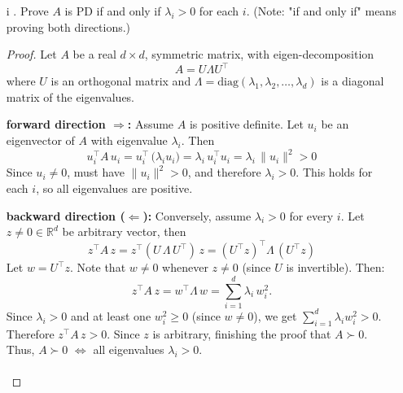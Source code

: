 \documentclass[lang=cn,11pt]{elegantbook}
\begin{document}
\begin{enumerate}
    \item[i]. Prove \(A\) is PD if and only if \(\lambda_i > 0\) for each \(i\). (Note: "if and only if" means proving both directions.)
\begin{proof}
Let \(A\) be a real \(d\times d\), symmetric matrix, with eigen-decomposition
\[
A = U\Lambda U^\top
\]
where \(U\) is an orthogonal matrix and \(\Lambda = \mathrm{diag}(\lambda_1,\lambda_2,\dots,\lambda_d)\) is a diagonal matrix of the eigenvalues.

\textbf{forward direction \(\Rightarrow\):}  Assume \(A\) is positive definite. Let \(u_i\) be an eigenvector of \(A\) with eigenvalue \(\lambda_i\). Then \[
   u_i^\top A\,u_i 
   = u_i^\top \,\bigl(\lambda_i u_i\bigr) 
   = \lambda_i\,u_i^\top u_i
   = \lambda_i\,\|u_i\|^2 >  0
\]
Since \(u_i\neq 0\), must have \(\|u_i\|^2 > 0\), and therefore \(\lambda_i > 0\). This holds for each $i$, so all eigenvalues are positive.

\textbf{backward direction (\(\Leftarrow\)):} Conversely, assume \(\lambda_i > 0\) for every \(i\).  Let $z \not = 0 \in \mathbb{R}^d$ be arbitrary vector, then \[
   z^\top A\,z 
   = z^\top (U\,\Lambda\,U^\top)\,z 
   = (U^\top z)^\top \Lambda \,(U^\top z)
   \]
   Let \(w = U^\top z\). Note that \(w \neq 0\) whenever \(z \neq 0\) (since \(U\) is invertible). Then: \[
   z^\top A\,z 
   = w^\top \Lambda\,w 
   = \sum_{i=1}^d \lambda_i\, w_i^2.
   \]Since \(\lambda_i > 0\) and at least one \(w_i^2 \ge 0\) (since \(w\neq 0\)), we get  \(\sum_{i=1}^d \lambda_i w_i^2 > 0.\)\\
Therefore \(z^\top A\,z > 0\). Since $z$ is arbitrary, finishing the proof that \(A \succ 0\).\\
Thus, \(A\succ 0\) \(\Longleftrightarrow\) all eigenvalues \(\lambda_i>0\).\\\\
\end{proof}



\end{enumerate}
\end{document}
